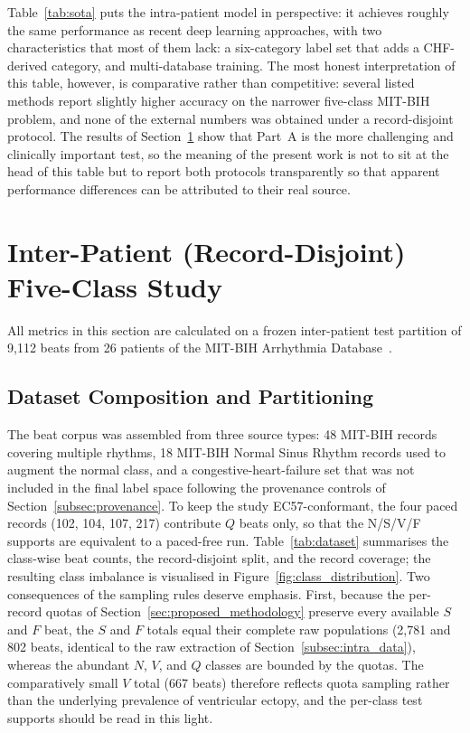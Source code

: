 Table~\ref{tab:sota} puts the intra-patient model in perspective: it
achieves roughly the same performance as recent deep learning approaches,
with two characteristics that most of them lack: a six-category label set
that adds a CHF-derived category, and multi-database training. The most honest
interpretation of this table, however, is comparative rather than
competitive: several listed methods report slightly higher accuracy on the
narrower five-class MIT-BIH problem, and none of the external numbers was
obtained under a record-disjoint protocol. The results of
Section~\ref{sec:inter} show that Part~A is the more challenging and
clinically important test, so the meaning of the present work is not to sit
at the head of this table but to report both protocols transparently so
that apparent performance differences can be attributed to their real
source.


\section{Inter-Patient (Record-Disjoint) Five-Class Study}
\label{sec:inter}

All metrics in this section are calculated on a frozen inter-patient test
partition of 9{,}112 beats from 26 patients of the MIT-BIH Arrhythmia
Database~\cite{moody2001mitbih,goldberger2000physionet}.

\subsection{Dataset Composition and Partitioning}
\label{subsec:dataset}

The beat corpus was assembled from three source types: 48 MIT-BIH records
covering multiple rhythms, 18 MIT-BIH Normal Sinus Rhythm records used to
augment the normal class, and a congestive-heart-failure set that was not
included in the final label space following the provenance controls of
Section~\ref{subsec:provenance}. To keep the study EC57-conformant, the four
paced records (102, 104, 107, 217) contribute $Q$ beats only, so that the
N/S/V/F supports are equivalent to a paced-free run. Table~\ref{tab:dataset}
summarises the class-wise beat counts, the record-disjoint split, and the
record coverage; the resulting class imbalance is visualised in
Figure~\ref{fig:class_distribution}. Two consequences of the sampling rules
deserve emphasis. First, because the per-record quotas of
Section~\ref{sec:proposed_methodology} preserve every available $S$ and $F$
beat, the $S$ and $F$ totals equal their complete raw populations (2,781 and
802 beats, identical to the raw extraction of Section~\ref{subsec:intra_data}),
whereas the abundant $N$, $V$, and $Q$ classes are bounded by the quotas.
The comparatively small $V$ total (667 beats) therefore reflects quota
sampling rather than the underlying prevalence of ventricular ectopy, and
the per-class test supports should be read in this light.

